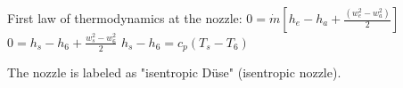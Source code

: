 First law of thermodynamics at the nozzle:  
\( 0 = \dot{m} \left[ h_e - h_a + \frac{(w_e^2 - w_a^2)}{2} \right] \)  
\( 0 = h_s - h_6 + \frac{w_s^2 - w_6^2}{2} \)  
\( h_s - h_6 = c_p (T_s - T_6) \)  

The nozzle is labeled as "isentropic Düse" (isentropic nozzle).